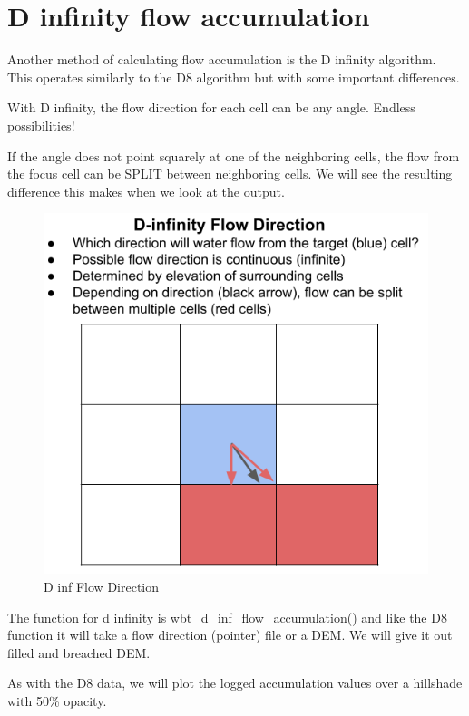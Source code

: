 \documentclass[
]{book}
\begin{document}
\hypertarget{d-infinity-flow-accumulation}{%
\section{D infinity flow accumulation}\label{d-infinity-flow-accumulation}}

Another method of calculating flow accumulation is the D infinity algorithm. This operates similarly to the D8 algorithm but with some important differences.

With D infinity, the flow direction for each cell can be any angle. Endless possibilities!

If the angle does not point squarely at one of the neighboring cells, the flow from the focus cell can be SPLIT between neighboring cells. We will see the resulting difference this makes when we look at the output.

\begin{figure}
\centering
\includegraphics{images/dinf-flow direction.png}
\caption{D inf Flow Direction}
\end{figure}

The function for d infinity is wbt\_d\_inf\_flow\_accumulation() and like the D8 function it will take a flow direction (pointer) file or a DEM. We will give it out filled and breached DEM.

As with the D8 data, we will plot the logged accumulation values over a hillshade with 50\% opacity.
\end{document}
